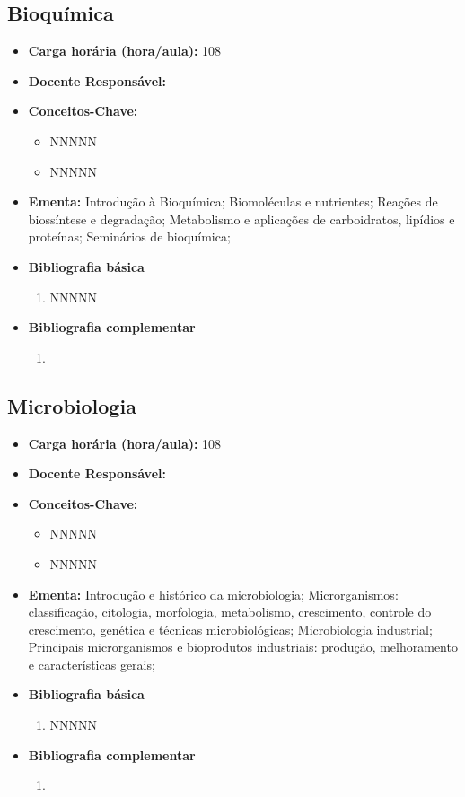 \documentclass[11pt,fleqn]{book} %
\begin{document}
\subsection{Bioquímica}\label{disc:bioquimica}
\begin{itemize}
	\item \textbf{Carga horária (hora/aula):} 108
	\item \textbf{Docente Responsável:}
	\item \textbf{Conceitos-Chave:}
	\begin{itemize}
		\item NNNNN
		\item NNNNN
	\end{itemize}
	\item \textbf{Ementa:} Introdução à Bioquímica; 
	Biomoléculas e nutrientes;
	Reações de biossíntese e degradação;
	Metabolismo e aplicações de carboidratos, lipídios e proteínas;
	Seminários de bioquímica;
	\item \textbf{Bibliografia básica}
	\begin{enumerate}
		\item NNNNN
	\end{enumerate}
	\item \textbf{Bibliografia complementar}
	\begin{enumerate}
		\item 
	\end{enumerate}	
\end{itemize}

\newpage
\subsection{Microbiologia}\label{disc:microbiologia}
\begin{itemize}
	\item \textbf{Carga horária (hora/aula):} 108
	\item \textbf{Docente Responsável:}
	\item \textbf{Conceitos-Chave:}
	\begin{itemize}
		\item NNNNN
		\item NNNNN
	\end{itemize}
	\item \textbf{Ementa:} Introdução e histórico da microbiologia; 
	Microrganismos: classificação, citologia, morfologia, metabolismo, crescimento, controle do crescimento, genética e técnicas microbiológicas;
	Microbiologia industrial; 
	Principais microrganismos e bioprodutos industriais: produção, melhoramento e características gerais;
	
	\item \textbf{Bibliografia básica}
	\begin{enumerate}
		\item NNNNN
	\end{enumerate}
	\item \textbf{Bibliografia complementar}
	\begin{enumerate}
		\item 
	\end{enumerate}	
\end{itemize}
\end{document}
